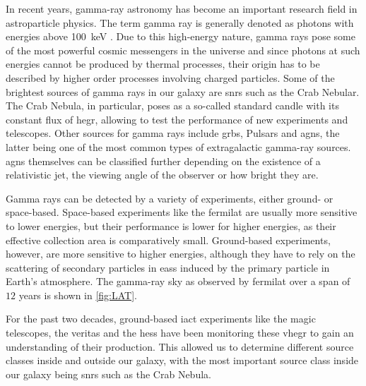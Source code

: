 In recent years, gamma-ray astronomy has become an important research field in astroparticle physics.
The term gamma ray is generally denoted as photons with energies above \SI{100}{\kilo\eV}
\cite{funk}. Due to this high-energy nature, gamma rays pose some of the most powerful cosmic messengers in
the universe and since photons at such energies cannot be produced by thermal processes, their origin
has to be described by higher order processes involving charged particles.
Some of the brightest sources of gamma rays in our galaxy are \glspl{snr} such as the Crab Nebular.
The Crab Nebula, in particular, poses as a so-called standard candle with its constant flux of
\gls{hegr}, allowing to test the performance of new experiments and telescopes. Other sources for
gamma rays include \glspl{grb}, Pulsars and \glspl{agn}, the latter being one of the most common types
of extragalactic gamma-ray sources.
\glspl{agn} themselves can be classified further depending on the existence
of a relativistic jet, the viewing angle of the observer or how bright they are.

Gamma rays can be detected by a variety of experiments, either ground- or space-based. Space-based
experiments like the \gls{fermilat} are usually more sensitive to lower energies, but their performance
is lower for higher energies, as their effective collection area is comparatively small. Ground-based
experiments, however, are more sensitive to higher energies, although they have to rely on the scattering
of secondary particles in \glspl{eas} induced by the primary particle in Earth's atmosphere.
The gamma-ray sky as observed by \gls{fermilat} over a span of
\(\num{12}\) years is shown in \autoref{fig:LAT}.

For the past two decades, ground-based \gls{iact} experiments like the \gls{magic} telescopes, the
\gls{veritas} and the \gls{hess} have been monitoring these \gls{vhegr} to gain an understanding of
their production. This allowed us to determine different source classes inside and outside our galaxy,
with the most important source class inside our galaxy being \glspl{snr} such as the Crab Nebula.





